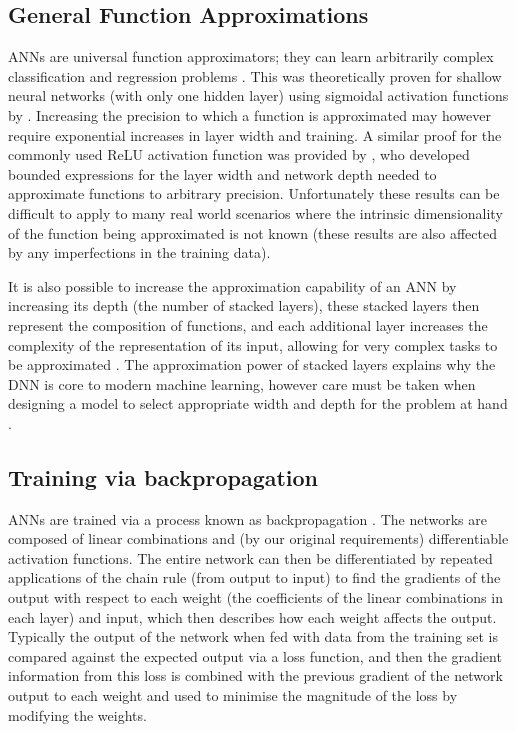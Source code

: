 \subsection{General Function Approximations}

ANNs are universal function approximators; they can learn arbitrarily complex classification and regression problems \citep{Rumelhart1986,1989Cybenko}.
This was theoretically proven for shallow neural networks (with only one hidden layer) using sigmoidal activation functions by \citet{1989Cybenko}.
Increasing the precision to which a function is approximated may however require exponential increases in layer width and training.
A similar proof for the commonly used ReLU activation function was provided by \citet{Lu2017}, who developed bounded expressions for the layer width and network depth needed to approximate functions to arbitrary precision.
Unfortunately these results can be difficult to apply to many real world scenarios where the intrinsic dimensionality of the function being approximated is not known (these results are also affected by any imperfections in the training data).

It is also possible to increase the approximation capability of an ANN by increasing its depth (the number of stacked layers), these stacked layers then represent the composition of functions, and each additional layer increases the complexity of the representation of its input, allowing for very complex tasks to be approximated \citep{Raschka2015}.
The approximation power of stacked layers explains why the DNN is core to modern machine learning, however care must be taken when designing a model to select appropriate width and depth for the problem at hand \citep{Lu2017}.

\subsection{Training via backpropagation}

ANNs are trained via a process known as backpropagation \citep{Rumelhart1986}.
The networks are composed of linear combinations and (by our original requirements) differentiable activation functions.
The entire network can then be differentiated by repeated applications of the chain rule (from output to input) to find the gradients of the output with respect to each weight (the coefficients of the linear combinations in each layer) and input, which then describes how each weight affects the output.
Typically the output of the network when fed with data from the training set is compared against the expected output via a loss function, and then the gradient information from this loss is combined with the previous gradient of the network output to each weight and used to minimise the magnitude of the loss by modifying the weights.

